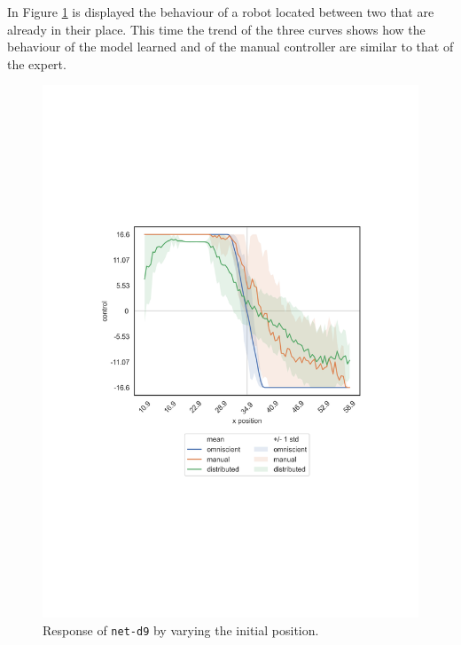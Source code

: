 In Figure \ref{fig:net-d9responseposition} is displayed the behaviour of a robot 
located between two that are already in their place.
This time the trend of the three curves shows how the behaviour of the model 
learned and of the manual controller are similar to that of the expert.
\begin{figure}[!htb]
	\centering
	\includegraphics[width=.45\textwidth]{contents/images/net-d9/response-varying_init_position-distributed}%
	\caption{Response of \texttt{net-d9} by varying the initial position.}
	\label{fig:net-d9responseposition}
\end{figure}


